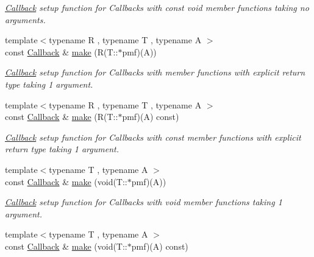 \begin{DoxyCompactItemize}
\begin{DoxyCompactList}\small\item\em \hyperlink{class_d_d4hep_1_1_callback}{Callback} setup function for Callbacks with const void member functions taking no arguments. \item\end{DoxyCompactList}\item 
{\footnotesize template$<$typename R , typename T , typename A $>$ }\\const \hyperlink{class_d_d4hep_1_1_callback}{Callback} \& \hyperlink{class_d_d4hep_1_1_callback_a04e19b0d13aa0fe1728326d79d204620}{make} (R(T::$\ast$pmf)(A))
\begin{DoxyCompactList}\small\item\em \hyperlink{class_d_d4hep_1_1_callback}{Callback} setup function for Callbacks with member functions with explicit return type taking 1 argument. \item\end{DoxyCompactList}\item 
{\footnotesize template$<$typename R , typename T , typename A $>$ }\\const \hyperlink{class_d_d4hep_1_1_callback}{Callback} \& \hyperlink{class_d_d4hep_1_1_callback_a128131dc329fa90dd9c4c73652050023}{make} (R(T::$\ast$pmf)(A) const)
\begin{DoxyCompactList}\small\item\em \hyperlink{class_d_d4hep_1_1_callback}{Callback} setup function for Callbacks with const member functions with explicit return type taking 1 argument. \item\end{DoxyCompactList}\item 
{\footnotesize template$<$typename T , typename A $>$ }\\const \hyperlink{class_d_d4hep_1_1_callback}{Callback} \& \hyperlink{class_d_d4hep_1_1_callback_ab277609e7c80369b36be7ab82531cf7f}{make} (void(T::$\ast$pmf)(A))
\begin{DoxyCompactList}\small\item\em \hyperlink{class_d_d4hep_1_1_callback}{Callback} setup function for Callbacks with void member functions taking 1 argument. \item\end{DoxyCompactList}\item 
{\footnotesize template$<$typename T , typename A $>$ }\\const \hyperlink{class_d_d4hep_1_1_callback}{Callback} \& \hyperlink{class_d_d4hep_1_1_callback_a48205c95d6aa007ce23b157d7977c704}{make} (void(T::$\ast$pmf)(A) const)

\end{DoxyCompactItemize}

